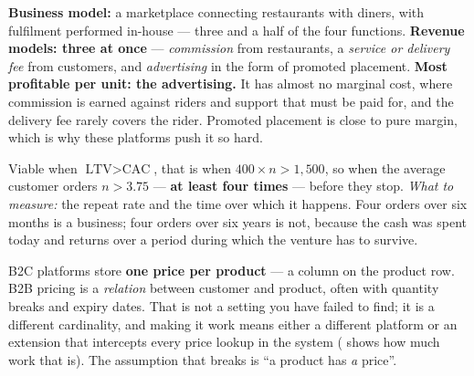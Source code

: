 \begin{ans}
  \item \textbf{Business model:} a marketplace connecting restaurants with
        diners, with fulfilment performed in-house --- three and a half of the
        four functions. \textbf{Revenue models: three at once} ---
        \emph{commission} from restaurants, a \emph{service or delivery fee}
        from customers, and \emph{advertising} in the form of promoted
        placement. \textbf{Most profitable per unit: the advertising.} It has
        almost no marginal cost, where commission is earned against riders and
        support that must be paid for, and the delivery fee rarely covers the
        rider. Promoted placement is close to pure margin, which is why these
        platforms push it so hard.
  \item Viable when $\text{LTV} > \text{CAC}$, that is when
        $400 \times n > 1{,}500$, so when the average customer orders
        $n > 3.75$ --- \textbf{at least four times} --- before they stop.
        \emph{What to measure:} the repeat rate and the time over which it
        happens. Four orders over six months is a business; four orders over
        six years is not, because the cash was spent today and returns over a
        period during which the venture has to survive.
  \item B2C platforms store \textbf{one price per product} --- a column on the
        product row. B2B pricing is a \emph{relation} between customer and
        product, often with quantity breaks and expiry dates. That is not a
        setting you have failed to find; it is a different cardinality, and
        making it work means either a different platform or an extension that
        intercepts every price lookup in the system ( shows how
        much work that is). The assumption that breaks is ``a product has
        \emph{a} price''.
\end{ans}

